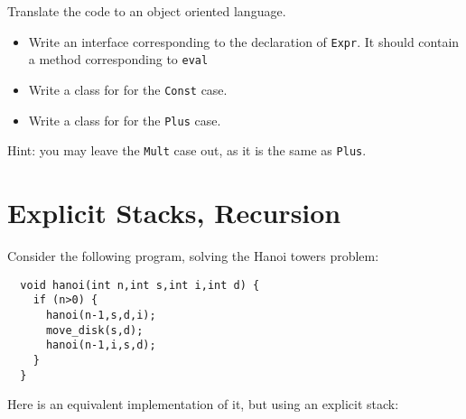 \documentclass{article}
\newcommand{\answer}[1]{}
\begin{document}
Translate the code to an object oriented language. 

\begin{itemize}
\item Write an interface corresponding to the declaration of \texttt{Expr}. It should contain a method corresponding to \texttt{eval} 
\item Write a class for for the \texttt{Const} case. 
\item Write a class for for the \texttt{Plus} case. 
\end{itemize}

Hint: you may leave the \texttt{Mult} case out, as it is the same as \texttt{Plus}.
\answer{
  \begin{verbatim}
    interface Expr { int eval(); }

    class Const implements Expr { int value; int eval() {return
        value;} }

    class Plus implements Expr { Expr l; Expr r; int eval() {return
        r.eval() + r.eval();} 
    }
\end{verbatim}
}

\newpage

\section{Explicit Stacks, Recursion}

Consider the following program, solving the Hanoi towers problem:

\begin{verbatim}
  void hanoi(int n,int s,int i,int d) {
    if (n>0) {
      hanoi(n-1,s,d,i);
      move_disk(s,d);
      hanoi(n-1,i,s,d);
    }
  }
\end{verbatim}


Here is an equivalent implementation of it, but using an explicit
stack:
\end{document}
